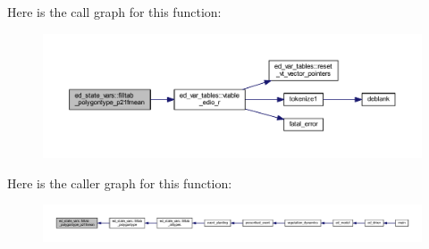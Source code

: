 Here is the call graph for this function\+:\nopagebreak
\begin{figure}[H]
\begin{center}
\leavevmode
\includegraphics[width=350pt]{namespaceed__state__vars_af19ecf7678627fccba6adcca82feb553_cgraph}
\end{center}
\end{figure}




Here is the caller graph for this function\+:\nopagebreak
\begin{figure}[H]
\begin{center}
\leavevmode
\includegraphics[width=350pt]{namespaceed__state__vars_af19ecf7678627fccba6adcca82feb553_icgraph}
\end{center}
\end{figure}


